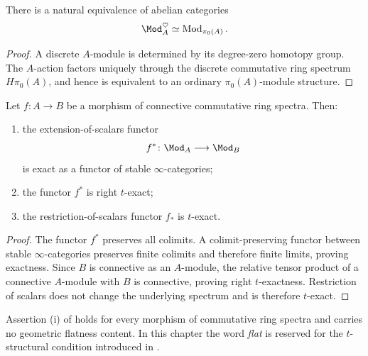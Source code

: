 \begin{proposition}
\label{prop:heart-module-category}
There is a natural equivalence of abelian categories
\[
    \Mod_A^\heartsuit
    \simeq
    \operatorname{Mod}_{\pi_0(A)}.
\]
\end{proposition}

\begin{proof}
A discrete $A$-module is determined by its degree-zero homotopy group. The
$A$-action factors uniquely through the discrete commutative ring spectrum
$H\pi_0(A)$, and hence is equivalent to an ordinary $\pi_0(A)$-module
structure.
\end{proof}

\begin{proposition}
\label{prop:base-change-exact-right-t-exact}
Let $f:A\to B$ be a morphism of connective commutative ring spectra.
Then:
\begin{enumerate}[label=(\roman*)]
    \item the extension-of-scalars functor
    \[
        f^*
        \colon
        \Mod_A
        \longrightarrow
        \Mod_B
    \]
    is exact as a functor of stable $\infty$-categories;

    \item the functor $f^*$ is right $t$-exact;

    \item the restriction-of-scalars functor $f_*$ is $t$-exact.
\end{enumerate}
\end{proposition}

\begin{proof}
The functor $f^*$ preserves all colimits. A colimit-preserving functor
between stable $\infty$-categories preserves finite colimits and therefore
finite limits, proving exactness. Since $B$ is connective as an
$A$-module, the relative tensor product of a connective $A$-module with
$B$ is connective, proving right $t$-exactness. Restriction of scalars does
not change the underlying spectrum and is therefore $t$-exact.
\end{proof}

\begin{remark}
\label{rem:stable-exactness-not-flatness}
Assertion (i) of  holds for every
morphism of commutative ring spectra and carries no geometric flatness
content. In this chapter the word \emph{flat} is reserved for the
$t$-structural condition introduced in
.
\end{remark}

